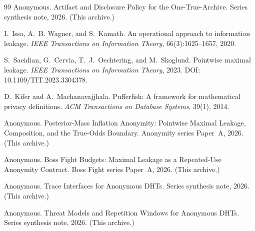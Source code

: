\documentclass[11pt]{article}
\begin{document}
\begin{thebibliography}{99}\small
{}
Anonymous.
\newblock Artifact and Disclosure Policy for the One-True-Archive.
\newblock Series synthesis note, 2026. (This archive.)

I.~Issa, A.~B. Wagner, and S.~Kamath.
\newblock An operational approach to information leakage.
\newblock \emph{IEEE Transactions on Information Theory}, 66(3):1625--1657, 2020.

S.~Saeidian, G.~Cervia, T.~J.~Oechtering, and M.~Skoglund.
\newblock Pointwise maximal leakage.
\newblock \emph{IEEE Transactions on Information Theory}, 2023. DOI: 10.1109/TIT.2023.3304378.

D.~Kifer and A.~Machanavajjhala.
\newblock Pufferfish: A framework for mathematical privacy definitions.
\newblock \emph{ACM Transactions on Database Systems}, 39(1), 2014.

Anonymous.
\newblock Posterior-Mass Inflation Anonymity: Pointwise Maximal Leakage, Composition, and the True-Odds Boundary.
\newblock Anonymity series Paper~A, 2026. (This archive.)

Anonymous.
\newblock Boss Fight Budgets: Maximal Leakage as a Repeated-Use Anonymity Contract.
\newblock Boss Fight series Paper~A, 2026. (This archive.)

Anonymous.
\newblock Trace Interfaces for Anonymous DHTs.
\newblock Series synthesis note, 2026. (This archive.)

Anonymous.
\newblock Threat Models and Repetition Windows for Anonymous DHTs.
\newblock Series synthesis note, 2026. (This archive.)
\end{thebibliography}
\end{document}
